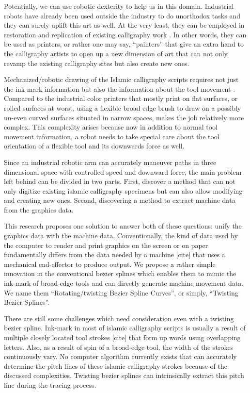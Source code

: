 {    Potentially, we can use robotic dexterity to help us in this domain. Industrial robots have already been used outside the industry to do unorthodox tasks \cite{bib09, bib10,bib11,bib12} and they can surely uplift this art as well. At the very least, they can be employed in restoration and replication of existing calligraphy work \cite{bib13}. In other words, they can be used as printers, or rather one may say, ``painters'' that give an extra hand to the calligraphy artists to open up a new dimension of art that can not only revamp the existing calligraphy sites but also create new ones.

    Mechanized/robotic drawing of the Islamic calligraphy scripts requires not just the ink-mark information but also the information about the tool movement \cite{bib03}. Compared to the industrial color printers that mostly print on flat surfaces, or rolled surfaces at worst, using a flexible broad edge brush to draw on a possibly un-even curved surfaces situated in narrow spaces, makes the job relatively more complex. This complexity arises because now in addition to normal tool movement information, a robot needs to take special care about the tool orientation of a flexible tool and its downwards force as well.

    Since an industrial robotic arm can accurately maneuver paths in three dimensional space with controlled speed and downward force, the main problem left behind can be divided in two parts. First, discover a method that can not only digitize existing islamic calligraphy specimens but can also allow modifying and creating new ones. Second, discovering a method to extract machine data from the graphics data.

    This research proposes one solution to answer both of these questions: unify the graphics data with the machine data. Conventionally, the kind of data used by the computer to render and print graphics on the screen or on paper fundamentally differs from the data needed by a machine [cite] that uses a mechanical end-effector to produce output. We propose a rather simple innovation in the conventional bezier splines which enables them to mimic the ink-mark of broad-edge tools and can directly generate machine movement data. We name them ``Rotating/twisting Bezier Spline Curves'', or simply, ``Twisting Bezier Splines''.

    There are still some challenges which need consideration even with a twisting bezier spline. Ink-mark in most of islamic calligraphy scripts is usually a result of multiple closely located tool strokes [cite] that form up words using overlapping letters. Also, as a result of spin of a broad-edge tool, the width of the strokes continuously vary. No computer algorithm currently exists that can accurately determine the pitch lines of these islamic calligraphy strokes because of the discussed complexities. Twisting bezier splines can intrinsically extract this pitch line during the tracing process.

}
